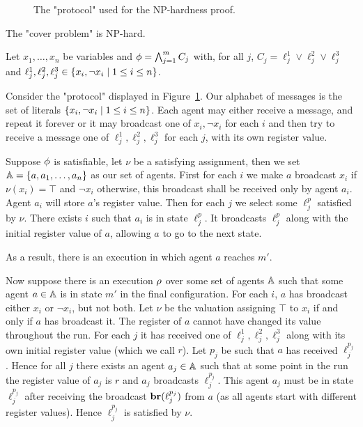 \begin{figure}[h]
	
	\caption{The "protocol" used for the NP-hardness proof.}
	\label{fig:np-hard}
\end{figure}

\begin{proposition}
	\label{prop:np-hard-query-cover}
	The "cover problem" is NP-hard.
\end{proposition}

Let $x_1, \ldots, x_n$ be variables and $\phi = \bigwedge_{j=1}^m C_j$ with, for all $j$, $C_j = \ell_j^1 \lor \ell_j^2 \lor \ell_j^3$ and $\ell_j^1, \ell_j^2, \ell_j^3 \in \{x_i, \neg x_i \mid 1 \leq i \leq n\}$. 

Consider the "protocol" displayed in Figure~\ref{fig:np-hard}.
Our alphabet of messages is the set of literals $\{x_i, \neg x_i \mid 1 \leq i \leq n\}$.
Each agent may either receive a message, and repeat it forever or it may broadcast one of $x_i, \neg x_i$ for each $i$ and then try to receive a message one of $\ell_j^1, \ell_j^2, \ell_j^3$ for each $j$, with its own register value.

Suppose $\phi$ is satisfiable, let $\nu$ be a satisfying assignment, then we set $\mathbb{A} = \{a, a_1, \ldots, a_n\}$ as our set of agents. First for each $i$ we make $a$ broadcast $x_i$ if $\nu(x_i)= \top$ and $\neg x_i$ otherwise, this broadcast shall be received only by agent $a_i$. Agent $a_i$ will store $a$'s register value.
Then for each $j$ we select some $\ell_j^p$ satisfied by $\nu$. There exists $i$ such that $a_i$ is in state $\ell_j^p$. It broadcasts $\ell_j^p$ along with the initial register value of $a$, allowing $a$ to go to the next state.

As a result, there is an execution in which agent $a$ reaches $m'$.

Now suppose there is an execution $\rho$ over some set of agents $\mathbb{A}$ such that some agent $a \in \mathbb{A}$ is in state $m'$ in the final configuration.
For each $i$, $a$ has broadcast either $x_i$ or $\neg x_i$, but not both.
Let $\nu$ be the valuation assigning $\top$ to $x_i$ if and only if $a$ has broadcast it.
The register of $a$ cannot have changed its value throughout the run. 
For each $j$ it has received one of $\ell_j^1, \ell_j^2, \ell_j^3$ along with its own initial register value (which we call $r$). Let $p_j$ be such that $a$ has received $\ell_j^{p_j}$.
Hence for all $j$ there exists an agent $a_j \in \mathbb{A}$ such that at some point in the run the register value of $a_j$ is $r$ and $a_j$ broadcasts $\ell_j^{p_j}$.
This agent $a_j$ must be in state $\ell_j^{p_j}$ after receiving the broadcast $\textbf{br}(\ell_j^{p_j})$ from $a$ (as all agents start with different register values).
Hence $\ell_j^{p_j}$ is satisfied by $\nu$. 


